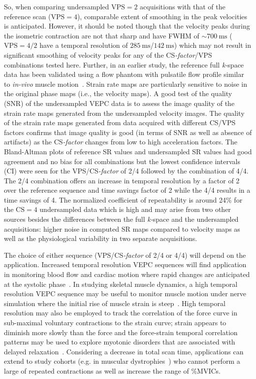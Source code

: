 So, when comparing undersampled $\mathrm{VPS} = 2$ acquisitions with that of the reference scan ($\mathrm{VPS} = 4$), comparable extent of smoothing in the peak velocities is anticipated. 
However, it should be noted though that the velocity peaks during the isometric contraction are not that sharp and have FWHM of $\sim \SI{700}{\milli\second}$  ($\mathrm{VPS} = 4/2$ have a temporal resolution of $\SI{285}{\milli\second}$/$\SI{142}{\milli\second}$) which may not result in significant smoothing of velocity peaks for any of the \mbox{CS\textit{-factor}}/VPS combinations tested here. 
Further, in an earlier study, the reference full \mbox{\textit{k-}space} data has been validated using a flow phantom with pulsatile flow profile similar to \textit{in-vivo} muscle motion~\cite{RNSS10}. 
Strain rate maps are particularly sensitive to noise in the original phase maps (i.e., the velocity maps). 
A good test of the quality (SNR) of the undersampled VEPC data is to assess the image quality of the strain rate maps generated from the undersampled velocity images. 
The quality of the strain rate maps generated from data acquired with different CS/VPS factors confirms that image quality is good (in terms of SNR as well as absence of artifacts) as the \mbox{CS\textit{-factor}} changes from low to high acceleration factors. 
The Bland-Altman plots of reference SR values and undersampled SR values had good agreement and no bias for all combinations but the lowest confidence intervals (CI) were seen for the VPS/\mbox{CS\textit{-factor}} of 2/4 followed by the combination of 4/4. 
The 2/4 combination offers an increase in temporal resolution by a factor of 2 over the reference sequence and time savings factor of 2 while the 4/4 results in a time savings of 4. 
The normalized coefficient of repeatability is around 24\% for the $\mathrm{CS} = 4$ undersampled data which is high and may arise from two other sources besides the differences between the full \mbox{\textit{k-}space} and the undersampled acquisitions: higher noise in computed SR maps compared to velocity maps as well as the physiological variability in two separate acquisitions. 

The choice of either sequence (VPS/\mbox{CS\textit{-factor}} of 2/4 or 4/4) will depend on the application. 
Increased temporal resolution VEPC sequences will find application in monitoring blood flow and cardiac motion where rapid changes are anticipated at the systolic phase~\cite{RNCS9, RNCS10}. 
In studying skeletal muscle dynamics, a high temporal resolution VEPC sequence may be useful to monitor muscle motion under nerve simulation where the initial rise of muscle strain is steep~\cite{RNCS12}. 
High temporal resolution may also be employed to track the correlation of the force curve in sub-maximal voluntary contractions to the strain curve; strain appears to diminish more slowly than the force and the force-strain temporal correlation patterns may be used to explore myotonic disorders that are associated with delayed relaxation~\cite{RNCS12}.
Considering a decrease in total scan time, applications can extend to study cohorts (e.g. in muscular dystrophies~\cite{RNCS12}) who cannot perform a large of repeated contractions as well as increase the range of \%MVICs.


